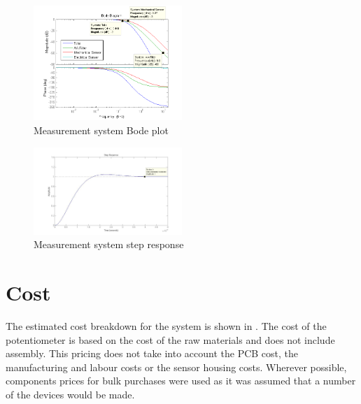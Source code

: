 \documentclass[10pt,twocolumn]{witseiepaper}
\begin{document}
\begin{figure}[h!]
	\centering
	\includegraphics[width=0.5\textwidth]{bode}
	\caption{Measurement system Bode plot}
	\label{fig:bode}
\end{figure}

\begin{figure}[h!]
	\centering
	\includegraphics[width=0.5\textwidth]{filterStep}
	\caption{Measurement system step response}
	\label{fig:step}
\end{figure}

\section{Cost}

The estimated cost breakdown for the system is shown in . The cost of the potentiometer is based on the cost of the raw materials and does not include assembly. This pricing does not take into account the PCB cost, the manufacturing and labour costs or the sensor housing costs. Wherever possible, components prices for bulk purchases were used as it was assumed that a number of the devices would be made.
\end{document}
